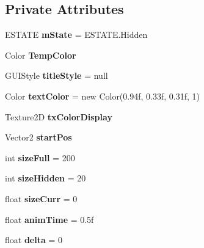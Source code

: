 \subsection*{Private Attributes}
\begin{DoxyCompactItemize}
\item 
\mbox{\label{class_color_picker_controller_a0c90d1b592b804db1982912bfe2615c8}} 
E\+S\+T\+A\+TE {\bfseries m\+State} = E\+S\+T\+A\+T\+E.\+Hidden
\item 
\mbox{\label{class_color_picker_controller_a49b79b52d3ffc4421a7778973eff4580}} 
Color {\bfseries Temp\+Color}
\item 
\mbox{\label{class_color_picker_controller_a658ac3e9ca673c2fa05886cc75414e45}} 
G\+U\+I\+Style {\bfseries title\+Style} = null
\item 
\mbox{\label{class_color_picker_controller_ab55c58211ad18fbe903d9465655ccc82}} 
Color {\bfseries text\+Color} = new Color(0.\+94f, 0.\+33f, 0.\+31f, 1)
\item 
\mbox{\label{class_color_picker_controller_a4ae48cfda522b72096ba90c4b3a0b7fc}} 
Texture2D {\bfseries tx\+Color\+Display}
\item 
\mbox{\label{class_color_picker_controller_a99f0cbaf66c5e8e5b97ea441a2c23a40}} 
Vector2 {\bfseries start\+Pos}
\item 
\mbox{\label{class_color_picker_controller_aefe25331805a8160067fab11f9f53ba4}} 
int {\bfseries size\+Full} = 200
\item 
\mbox{\label{class_color_picker_controller_a21972003f75ee7edff4bdce32687a45e}} 
int {\bfseries size\+Hidden} = 20
\item 
\mbox{\label{class_color_picker_controller_a65a5588da5ac9a4fe42f5f414b122d21}} 
float {\bfseries size\+Curr} = 0
\item 
\mbox{\label{class_color_picker_controller_aa15c2f9055d62dc7dbe553369fde9079}} 
float {\bfseries anim\+Time} = 0.\+5f
\item 
\mbox{\label{class_color_picker_controller_aa91cd33a05a29fd00546de8483246ed0}} 
float {\bfseries delta} = 0
\end{DoxyCompactItemize}
